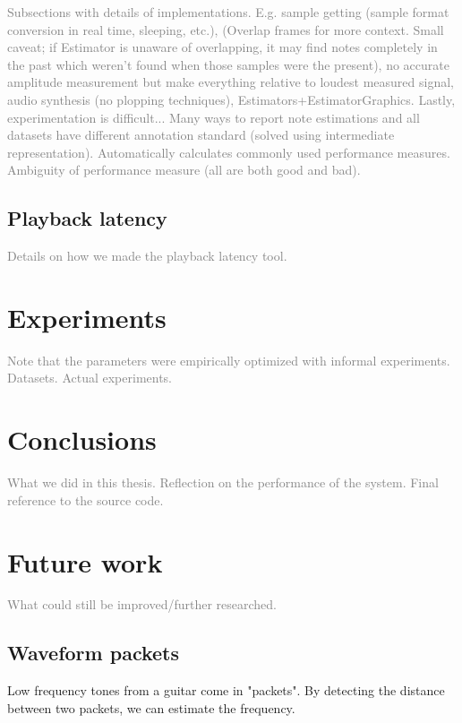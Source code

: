\documentclass[10pt,twocolumn]{article}
\begin{document}
\textcolor{gray}{Subsections with details of implementations. E.g. sample getting (sample format conversion in real time, sleeping, etc.), (Overlap frames for more context. Small caveat; if Estimator is unaware of overlapping, it may find notes completely in the past which weren't found when those samples were the present), no accurate amplitude measurement but make everything relative to loudest measured signal, audio synthesis (no plopping techniques), Estimators+EstimatorGraphics. Lastly, experimentation is difficult... Many ways to report note estimations and all datasets have different annotation standard (solved using intermediate representation). Automatically calculates commonly used performance measures. Ambiguity of performance measure (all are both good and bad).}

\subsection{Playback latency}  \label{sub:playback_latency}
\textcolor{gray}{Details on how we made the playback latency tool.}


\section{Experiments}  \label{sec:exp}
\textcolor{gray}{Note that the parameters were empirically optimized with informal experiments. Datasets. Actual experiments.}


\section{Conclusions}
\textcolor{gray}{What we did in this thesis. Reflection on the performance of the system. Final reference to the source code.}


\section{Future work}  \label{sec:future}
\textcolor{gray}{What could still be improved/further researched.}

\subsection{Waveform packets}  \label{sub:waveform_packet}
Low frequency tones from a guitar come in "packets". By detecting the distance between two packets, we can estimate the frequency.
\end{document}
